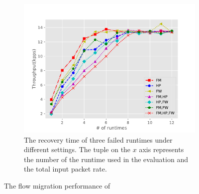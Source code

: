 \begin{figure}[!ht]
   \begin{subfigure}[t]{0.33\linewidth}
  \centering
    \includegraphics[width=\columnwidth]{figure/NormalCaseTP.pdf}
    \caption{The recovery time of three failed runtimes under different settings. The tuple on the $x$ axis represents the number of the runtime used in the evaluation and the total input packet rate. }\label{fig:rep-recovery} \end{subfigure}
 \caption{The flow migration performance of \nfactor}
\label{fig:rep-perf}
\end{figure}
